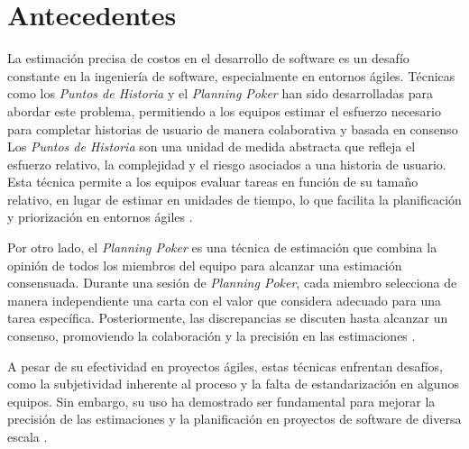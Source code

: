 \section{Antecedentes}
La estimación precisa de costos en el desarrollo de software es un desafío constante en la ingeniería de software, especialmente en entornos ágiles. Técnicas como los \textit{Puntos de Historia} y el \textit{Planning Poker} han sido desarrolladas para abordar este problema, permitiendo a los equipos estimar el esfuerzo necesario para completar historias de usuario de manera colaborativa 
y basada en consenso \parencite{asana_planning_poker}
Los \textit{Puntos de Historia} son una unidad de medida abstracta que refleja el esfuerzo relativo, la complejidad y el riesgo asociados a una historia de usuario. Esta técnica permite a los equipos evaluar tareas en función de su tamaño relativo, en lugar de estimar en unidades de tiempo, lo que facilita 
la planificación y priorización en entornos ágiles \parencite{asana_story_points}.

Por otro lado, el \textit{Planning Poker} es una técnica de estimación que combina la opinión de todos los miembros del equipo para alcanzar una estimación consensuada. Durante una sesión de \textit{Planning Poker}, cada miembro selecciona de manera independiente una carta con el valor que considera adecuado para una tarea específica. Posteriormente, las discrepancias se discuten hasta alcanzar un consenso, promoviendo 
la colaboración y la precisión en las estimaciones \parencite{asana_planning_poker}.

A pesar de su efectividad en proyectos ágiles, estas técnicas enfrentan desafíos, como la subjetividad inherente al proceso y la falta de estandarización en algunos equipos. Sin embargo, su uso ha demostrado ser fundamental para mejorar la precisión de las estimaciones y la planificación 
en proyectos de software de diversa escala \parencite{asana_planning_poker}.
